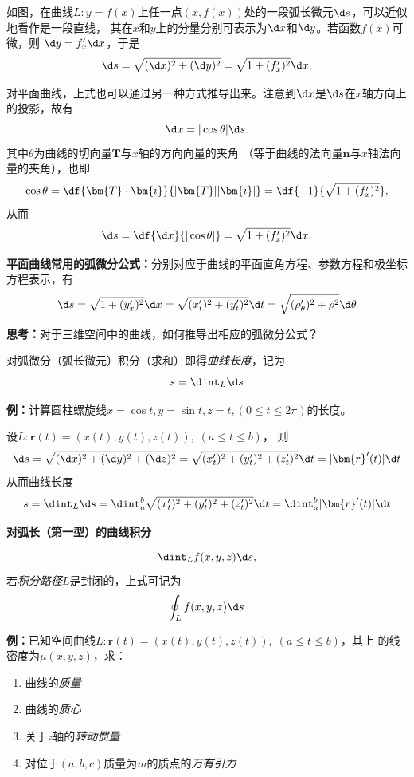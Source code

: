 如图，在曲线$L:y=f(x)$上任一点$(x,f(x))$处的一段弧长微元$\d s$，可以近似地看作是一段直线，
其在$x$和$y$上的分量分别可表示为$\d x$和$\d y$。若函数$f(x)$可微，则
$\d y=f'_x\d x$，于是
$$\d s=\sqrt{(\d x)^2+(\d y)^2}=\sqrt{1+(f'_x)^2}\d x.$$

对平面曲线，上式也可以通过另一种方式推导出来。注意到$\d x$是$\d s$在$x$轴方向上的投影，故有
$$\d x=|\cos\theta|\d s.$$
其中$\theta$为曲线的切向量$\bm{T}$与$x$轴的方向向量的夹角
（等于曲线的法向量$\bm{n}$与$x$轴法向量的夹角），也即
$$\cos\theta=\df{\bm{T}\cdot\bm{i}}{|\bm{T}||\bm{i}|}
=\df{-1}{\sqrt{1+(f'_x)^2}},$$
从而
$$\d s=\df{\d x}{|\cos\theta|}=\sqrt{1+(f'_x)^2}\d x.$$

{\bf 平面曲线常用的弧微分公式：}分别对应于曲线的平面直角方程、参数方程和极坐标方程表示，有
	$$\d s=\sqrt{1+(y'_x)^2}\d x=\sqrt{(x'_t)^2+(y'_t)^2}\d t
	=\sqrt{(\rho'_{\theta})^2+\rho^2}\d\theta$$

{\bf 思考：}对于三维空间中的曲线，如何推导出相应的弧微分公式？

对弧微分（弧长微元）积分（求和）即得{\it 曲线长度}，记为
$$s=\dint_L\d s$$


{\bf 例：}计算圆柱螺旋线$x=\cos t,y=\sin t,z=t,(0\leq t\leq 2\pi)$的长度。

设$L:\bm{r}(t)=(x(t),y(t),z(t)),\;(a\leq t\leq b)$， 则
$${\d s=\sqrt{(\d x)^2+(\d y)^2+(\d z)^2}
=\sqrt{(x'_t)^2+(y'_t)^2+(z'_t)^2}\d t} =|\bm{r}'(t)|\d t$$
从而曲线长度
$${s=\dint_L\d s =\dint_a^b\sqrt{(x'_t)^2+(y'_t)^2+(z'_t)^2}\d t
 =\dint_a^b|\bm{r}'(t)|\d t}$$

{\bf 对弧长（第一型）的曲线积分}

$$\dint_Lf(x,y,z)\d s,$$
若{\it 积分路径}$L$是封闭的，上式可记为
$$\oint_Lf(x,y,z)\d s$$

{\bf 例：}已知空间曲线$L:\bm{r}(t)=(x(t),y(t),z(t)),\;(a\leq t\leq b)$，其上
的线密度为$\mu(x,y,z)$，求：
\begin{enumerate}[(1)]
  \setlength{\itemindent}{1cm}
  \item 曲线的{\it 质量}
  \item 曲线的{\it 质心}
  \item 关于$z$轴的{\it 转动惯量}
  \item 对位于$(a,b,c)$质量为$m$的质点的{\it 万有引力}
\end{enumerate}

